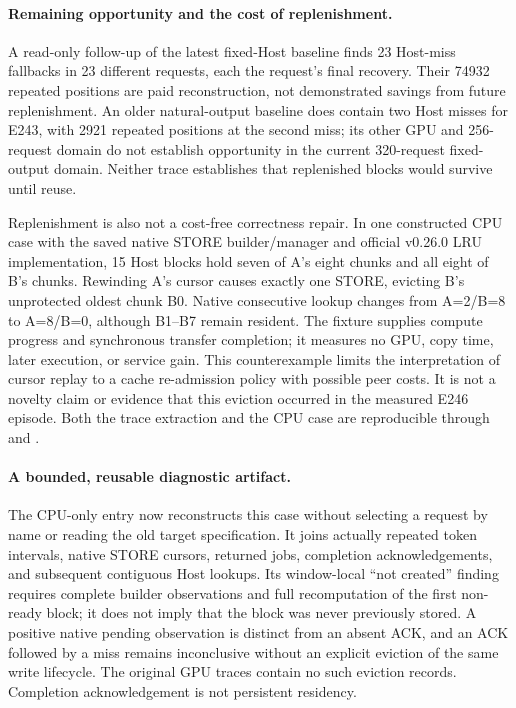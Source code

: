 \documentclass[10pt,a4paper]{article}
\begin{document}
\paragraph{Remaining opportunity and the cost of replenishment.}
A read-only follow-up of the latest fixed-Host baseline finds 23 Host-miss
fallbacks in 23 different requests, each the request's final recovery. Their
74932 repeated positions are paid reconstruction, not demonstrated savings
from future replenishment. An older natural-output baseline does contain two
Host misses for E243, with 2921 repeated positions at the second miss; its
other GPU and 256-request domain do not establish opportunity in the current
320-request fixed-output domain. Neither trace establishes that replenished
blocks would survive until reuse.

Replenishment is also not a cost-free correctness repair. In one constructed
CPU case with the saved native STORE builder/manager and official v0.26.0
LRU implementation, 15 Host blocks hold seven of A's eight chunks and all
eight of B's chunks. Rewinding A's cursor causes exactly one STORE, evicting
B's unprotected oldest chunk B0. Native consecutive lookup changes from
A=2/B=8 to A=8/B=0, although B1--B7 remain resident. The fixture supplies
compute progress and synchronous transfer completion; it measures no GPU,
copy time, later execution, or service gain. This counterexample limits the
interpretation of cursor replay to a cache re-admission policy with possible
peer costs. It is not a novelty claim or evidence that this eviction occurred
in the measured E246 episode. Both the trace extraction and the CPU case are
reproducible through  and
.

\paragraph{A bounded, reusable diagnostic artifact.}
The CPU-only entry  now reconstructs this
case without selecting a request by name or reading the old target
specification. It joins actually repeated token intervals, native STORE
cursors, returned jobs, completion acknowledgements, and subsequent
contiguous Host lookups. Its window-local ``not created'' finding requires
complete builder observations and full recomputation of the first non-ready
block; it does not imply that the block was never previously stored. A
positive native pending observation is distinct from an absent ACK, and an
ACK followed by a miss remains inconclusive without an explicit eviction of
the same write lifecycle. The original GPU traces contain no such eviction
records. Completion acknowledgement is not persistent residency.
\end{document}
